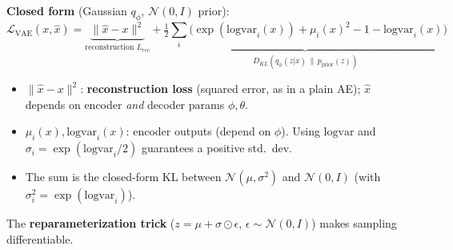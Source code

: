 \documentclass[10pt,a4paper]{article}
\begin{document}
	\begin{formulabox}
		\textbf{Closed form} (Gaussian $q_\phi$, $\mathcal{N}(0,I)$ prior):
		\[
		\mathcal{L}_{\text{VAE}}(x,\hat x) =
		\underbrace{\|\hat x - x\|^2}_{\text{reconstruction } L_{rec}}
		+ \underbrace{\tfrac{1}{2}\sum_i\big(\exp(\mathrm{logvar}_i(x)) + \mu_i(x)^2 - 1 - \mathrm{logvar}_i(x)\big)}_{D_{KL}(q_\phi(z|x)\,\|\,p_{\text{prior}}(z))}
		\]
	\end{formulabox}
	\begin{itemize}[leftmargin=*]
		\item $\|\hat x - x\|^2$: \textbf{reconstruction loss} (squared error, as in a plain AE); $\hat x$ depends on encoder \emph{and} decoder params $\phi,\theta$.
		\item $\mu_i(x),\mathrm{logvar}_i(x)$: encoder outputs (depend on $\phi$). Using $\mathrm{logvar}$ and $\sigma_i = \exp(\mathrm{logvar}_i/2)$ guarantees a positive std.\ dev.
		\item The sum is the closed-form KL between $\mathcal{N}(\mu,\sigma^2)$ and $\mathcal{N}(0,I)$ (with $\sigma_i^2=\exp(\mathrm{logvar}_i)$).
	\end{itemize}
	
	The \textbf{reparameterization trick} ($z = \mu + \sigma \odot \epsilon$, $\epsilon\sim\mathcal{N}(0,I)$) makes sampling differentiable.
\end{document}
